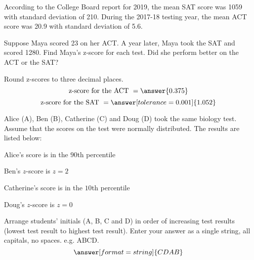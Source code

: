 \documentclass{ximera}
\begin{document}
\begin{problem}\label{prob:140hom3prob3}
According to the College Board report for 2019, the mean SAT score was 1059 with standard deviation of 210.  During the 2017-18 testing year, the mean ACT score was 20.9 with standard deviation of 5.6.  

Suppose Maya scored 23 on her ACT.  A year later, Maya took the SAT and scored 1280.  Find Maya's z-score for each test.  Did she perform better on the ACT or the SAT?

Round z-scores to three decimal places.
$$\mbox{z-score for the ACT }=\answer{0.375}$$
$$\mbox{z-score for the SAT }=\answer[tolerance=0.001]{1.052}$$

\begin{multipleChoice}  
\end{multipleChoice}
\end{problem}

\begin{problem}\label{prob:140hom3prob4}

Alice (A), Ben (B), Catherine (C) and Doug (D) took the same biology test.  Assume that the scores on the test were normally distributed.  The results are listed below: 

Alice's score is in the $90$th percentile 

Ben's $z$-score is $z = 2$ 

Catherine's score is in the $10$th percentile 

Doug's $z$-score is $z = 0$

Arrange students’ initials (A, B, C and D) in order of increasing test results (lowest test result to highest test result).  Enter your answer as a single string, all capitals, no spaces.  e.g. ABCD.
$$\answer[format=string]{CDAB}$$
\end{problem}
\end{document}
